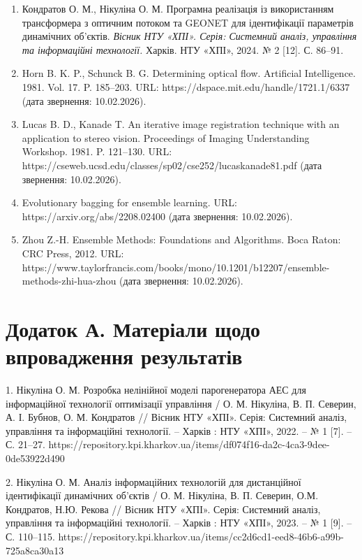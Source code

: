 \documentclass[
]{article}
\begin{document}
\begin{enumerate}
\item
  Кондратов О. М., Нікуліна О. М. Програмна реалізація із використанням трансформера з оптичним потоком та GEONET для ідентифікації параметрів динамічних об'єктів. \emph{Вісник НТУ «ХПІ». Серія: Системний аналіз, управління та інформаційні технології.} Харків. НТУ «ХПІ», 2024. № 2 {[}12{]}. С. 86--91.
\item
  Horn B. K. P., Schunck B. G. Determining optical flow. Artificial Intelligence. 1981. Vol. 17. P. 185--203. URL: https://dspace.mit.edu/handle/1721.1/6337 (дата звернення: 10.02.2026).
\item
  Lucas B. D., Kanade T. An iterative image registration technique with an application to stereo vision. Proceedings of Imaging Understanding Workshop. 1981. P. 121--130. URL: https://cseweb.ucsd.edu/classes/sp02/cse252/lucaskanade81.pdf (дата звернення: 10.02.2026).
\item
  Evolutionary bagging for ensemble learning. URL: https://arxiv.org/abs/2208.02400 (дата звернення: 10.02.2026).
\item
  Zhou Z.-H. Ensemble Methods: Foundations and Algorithms. Boca Raton: CRC Press, 2012. URL: https://www.taylorfrancis.com/books/mono/10.1201/b12207/ensemble-methods-zhi-hua-zhou (дата звернення: 10.02.2026).\protect{}\label{_Ref221389746}{}
\end{enumerate}

\section{Додаток А. Матеріали щодо впровадження результатів}\label{ux434ux43eux434ux430ux442ux43eux43a-ux430.-ux43cux430ux442ux435ux440ux456ux430ux43bux438-ux449ux43eux434ux43e-ux432ux43fux440ux43eux432ux430ux434ux436ux435ux43dux43dux44f-ux440ux435ux437ux443ux43bux44cux442ux430ux442ux456ux432}

1. Нікуліна О. М. Розробка нелінійної моделі парогенератора АЕС для інформаційної технології оптимізації управління / О. М. Нікуліна, В. П. Северин, А. І. Бубнов, О. М. Кондратов // Вісник НТУ «ХПІ». Серія: Системний аналіз, управління та інформаційні технології. -- Харків : НТУ «ХПІ», 2022. -- № 1 {[}7{]}. -- С. 21--27. https://repository.kpi.kharkov.ua/items/df074f16-da2c-4ca3-9dee-0de53922d490

2. Нікуліна О. М. Аналіз інформаційних технологій для дистанційної ідентифікації динамічних об'єктів / О. М. Нікуліна, В. П. Северин, О.М. Кондратов, Н.Ю. Рекова // Вісник НТУ «ХПІ». Серія: Системний аналіз, управління та інформаційні технології. -- Харків : НТУ «ХПІ», 2023. -- № 1 {[}9{]}. -- С. 110--115. https://repository.kpi.kharkov.ua/items/cc2d6cd1-eed8-46b6-a99b-725a8ca30a13
\end{document}
